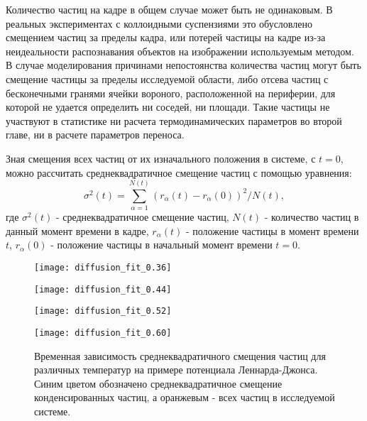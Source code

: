 Количество частиц на кадре в общем случае может быть не одинаковым. В реальных экспериментах с коллоидными суспензиями это обусловлено смещением частиц за пределы кадра, или потерей частицы на кадре из-за неидеальности распознавания объектов на изображении используемым методом. В случае моделирования причинами непостоянства количества частиц могут быть смещение частицы за пределы исследуемой области, либо отсева частиц с бесконечными гранями ячейки вороного, расположенной на периферии, для которой не удается определить ни соседей, ни площади. Такие частицы не участвуют в статистике ни расчета термодинамических параметров во второй главе, ни в расчете параметров переноса. 

Зная смещения всех частиц от их изначального положения в системе, с $t = 0$, можно рассчитать среднеквадратичное смещение частиц с помощью уравнения:
\begin{equation}
    \sigma^2(t) = \sum\limits_{\alpha = 1}^{N(t)} (r_{\alpha}(t) - r_{\alpha}(0))^2 / N(t),
    \label{eqRMS}
\end{equation}
где $\sigma^2(t)$ - среднеквадратичное смещение частиц, $N(t)$ - количество частиц в данный момент времени в кадре, $r_{\alpha}(t)$ - положение частицы в момент времени $t$, $r_{\alpha}(0)$ - положение частицы в начальный момент времени $t = 0$.

\begin{figure}[h]
\begin{center}
\begin{minipage}[h]{0.45\linewidth}
\texttt{[image: diffusion\_fit\_0.36]}
\end{minipage}
\begin{minipage}[h]{0.45\linewidth}
\texttt{[image: diffusion\_fit\_0.44]}
\end{minipage}

\begin{minipage}[h]{0.45\linewidth}
\texttt{[image: diffusion\_fit\_0.52]}
\end{minipage}
\begin{minipage}[h]{0.45\linewidth}
\texttt{[image: diffusion\_fit\_0.60]}
\end{minipage}
\caption{Временная зависимость среднеквадратичного смещения частиц для различных температур на примере потенциала Леннарда-Джонса. Синим цветом обозначено среднеквадратичное смещение конденсированных частиц,  а оранжевым - всех частиц в исследуемой системе.}
\label{risRMS}
\end{center}
\end{figure}

